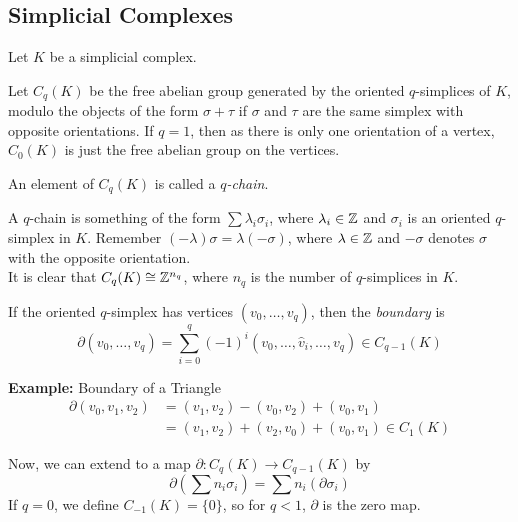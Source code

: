 \subsection*{Simplicial Complexes}
\sectionspace

Let $K$ be a simplicial complex.

\begin{definition}
    Let $C_q(K)$ be the free abelian group generated by the oriented $q$-simplices of $K$, modulo the objects of the form $\sigma + \tau$ if $\sigma$ and $\tau$ are the same simplex with opposite orientations. If $q = 1$, then as there is only one orientation of a vertex, $C_{0}(K)$ is just the free abelian group on the vertices.
\end{definition}

\begin{definition}
    An element of $C_q(K)$ is called a \emph{$q$-chain}.
\end{definition}

A $q$-chain is something of the form $\sum \lambda_i\sigma_i$, where $\lambda_i \in \mathbb{Z}$ and $\sigma_i$ is an oriented $q$-simplex in $K$. Remember $(-\lambda)\sigma = \lambda(-\sigma)$, where $\lambda \in \mathbb{Z}$ and $-\sigma$ denotes $\sigma$ with the opposite orientation.\\

It is clear that $C_q(K) \cong \mathbb{Z}^{n_q}$, where $n_q$ is the number of $q$-simplices in $K$.

\begin{definition}
    If the oriented $q$-simplex has vertices $(v_0, \ldots, v_q)$, then the \emph{boundary} is
    \[ \partial(v_0, \ldots, v_q) = \sum_{i = 0}^{q} (-1)^{i}(v_0, \ldots, \widehat{v}_i, \ldots, v_q) \in C_{q - 1}(K) \]
\end{definition}

\begin{example}{\textbf{Example:} Boundary of a Triangle}
    \begin{align*}
        \partial(v_0, v_1, v_2) &= (v_1, v_2) - (v_0, v_2) + (v_0, v_1)\\
        &= (v_1, v_2) + (v_2, v_0) + (v_0, v_1) \in C_1(K)
    \end{align*}
\end{example}

Now, we can extend to a map $\partial : C_q(K) \to C_{q - 1}(K)$ by
\[ \partial\left(\sum n_i\sigma_i\right) = \sum n_i(\partial\sigma_i) \]
If $q = 0$, we define $C_{-1}(K) = \{0\}$, so for $q < 1$, $\partial$ is the zero map.

